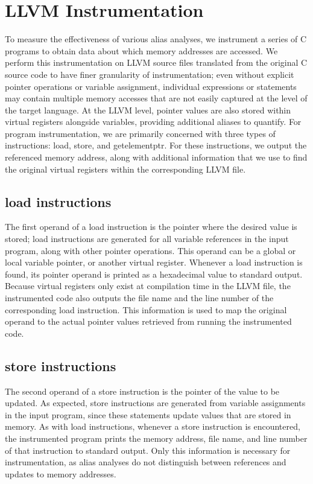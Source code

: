 \section{LLVM Instrumentation}
To measure the effectiveness of various alias analyses, we instrument a series of C programs to obtain data about which memory addresses are accessed. We perform this instrumentation on LLVM source files translated from the original C source code to have finer granularity of instrumentation; even without explicit pointer operations or variable assignment, individual expressions or statements may contain multiple memory accesses that are not easily captured at the level of the target language. At the LLVM level, pointer values are also stored within virtual registers alongside variables, providing additional aliases to quantify. For program instrumentation, we are primarily concerned with three types of instructions: load, store, and getelementptr. For these instructions, we output the referenced memory address, along with additional information that we use to find the original virtual registers within the corresponding LLVM file.

\subsection{load instructions}
The first operand of a load instruction is the pointer where the desired value is stored; load instructions are generated for all variable references in the input program, along with other pointer operations. This operand can be a global or local variable pointer, or another virtual register. Whenever a load instruction is found, its pointer operand is printed as a hexadecimal value to standard output. Because virtual registers only exist at compilation time in the LLVM file, the instrumented code also outputs the file name and the line number of the corresponding load instruction. This information is used to map the original operand to the actual pointer values retrieved from running the instrumented code.

\subsection{store instructions}
The second operand of a store instruction is the pointer of the value to be updated. As expected, store instructions are generated from variable assignments in the input program, since these statements update values that are stored in memory. As with load instructions, whenever a store instruction is encountered, the instrumented program prints the memory address, file name, and line number of that instruction to standard output. Only this information is necessary for instrumentation, as alias analyses do not distinguish between references and updates to memory addresses.

